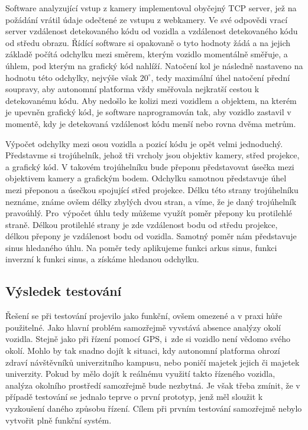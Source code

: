 \documentclass[czech, bachelor]{diploma}
\begin{document}
Software analyzující vstup z kamery implementoval obyčejný TCP server, jež na požádání vrátil údaje odečtené ze vstupu
z webkamery. Ve své odpovědi vrací server vzdálenost detekovaného kódu od vozidla a vzdálenost detekovaného kódu od středu obrazu.
Řídící software si opakovaně o tyto hodnoty žádá a na jejich základě počítá odchylku mezi směrem, kterým vozidlo momentálně
směřuje, a úhlem, pod kterým na grafický kód nahlíží. Natočení kol je následně nastaveno na hodnotu této odchylky, nejvýše však
$20^{\circ}$, tedy maximální úhel natočení přední soupravy, aby autonomní platforma vždy směřovala nejkratší cestou k detekovanému
kódu. Aby nedošlo ke kolizi mezi vozidlem a objektem, na kterém je upevněn grafický kód, je software naprogramován tak, aby
vozidlo zastavil v momentě, kdy je detekovaná vzdálenost kódu menší nebo rovna dvěma metrům.

Výpočet odchylky mezi osou vozidla a pozicí kódu je opět velmi jednoduchý. Představme si trojúhelník, jehož tři vrcholy jsou
objektiv kamery, střed projekce, a grafický kód. V takovém trojúhelníku bude přeponu představovat úsečka mezi objektivem kamery
a grafickým bodem. Odchylku samotnou představuje úhel mezi přeponou a úsečkou spojující střed projekce. Délku této strany
trojúhelníku neznáme, známe ovšem délky zbylých dvou stran, a víme, že je daný trojúhelník pravoúhlý. Pro~výpočet úhlu tedy můžeme
využít poměr přepony ku protilehlé straně. Délkou protilehlé strany je zde vzdálenost bodu od středu projekce, délkou přepony
je vzdálenost bodu od vozidla. Samotný poměr nám představuje sinus hledaného úhlu. Na poměr tedy aplikujeme funkci arkus sinus,
funkci inverzní k funkci sinus, a získáme hledanou odchylku.

\subsection{Výsledek testování}

Řešení se při testování projevilo jako funkční, ovšem omezené a v praxi hůře použitelné. Jako hlavní problém samozřejmě vyvstává
absence analýzy okolí vozidla. Stejně jako při řízení pomocí GPS, i~zde si vozidlo není vědomo svého okolí. Mohlo by tak snadno
dojít k situaci, kdy autonomní platforma ohrozí zdraví návštěvníků univerzitního kampusu, nebo poničí majetek jejich či majetek
univerzity. Pokud by mělo dojít k reálnému využití takto řízeného vozidla, analýza okolního prostředí samozřejmě bude nezbytná.
Je však třeba zmínit, že v případě testování se jednalo teprve o první prototyp, jenž měl sloužit k vyzkoušení daného způsobu
řízení. Cílem při prvním testování samozřejmě nebylo vytvořit plně funkční systém.
\end{document}
